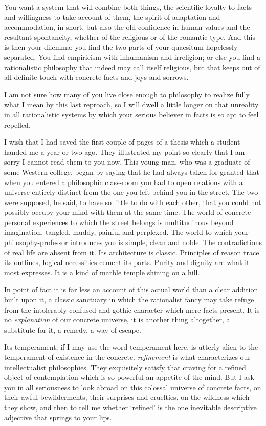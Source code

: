 \documentclass[]{article}
\begin{document}
You want a system that will combine both things, the scientific
loyalty to facts and willingness to take account of them, the spirit of
adaptation and accommodation, in short, but also the old confidence in
human values and the resultant spontaneity, whether of the religious or
of the romantic type. And this is then your dilemma: you find the two
parts of your quaesitum hopelessly separated. You find empiricism with
inhumanism and irreligion; or else you find a rationalistic philosophy
that indeed may call itself religious, but that keeps out of all
definite touch with concrete facts and joys and sorrows.

I am not sure how many of you live close enough to philosophy to realize
fully what I mean by this last reproach, so I will dwell a little longer
on that unreality in all rationalistic systems by which your serious
believer in facts is so apt to feel repelled.

I wish that I had saved the first couple of pages of a thesis which
a student handed me a year or two ago. They illustrated my point so
clearly that I am sorry I cannot read them to you now. This young man,
who was a graduate of some Western college, began by saying that he had
always taken for granted that when you entered a philosophic class-room
you had to open relations with a universe entirely distinct from the one
you left behind you in the street. The two were supposed, he said, to
have so little to do with each other, that you could not possibly occupy
your mind with them at the same time. The world of concrete personal
experiences to which the street belongs is multitudinous beyond
imagination, tangled, muddy, painful and perplexed. The world to which
your philosophy-professor introduces you is simple, clean and noble.
The contradictions of real life are absent from it. Its architecture is
classic. Principles of reason trace its outlines, logical necessities
cement its parts. Purity and dignity are what it most expresses. It is a
kind of marble temple shining on a hill.

In point of fact it is far less an account of this actual world than
a clear addition built upon it, a classic sanctuary in which the
rationalist fancy may take refuge from the intolerably confused and
gothic character which mere facts present. It is no \emph{explanation} of our
concrete universe, it is another thing altogether, a substitute for it,
a remedy, a way of escape.

Its temperament, if I may use the word temperament here, is utterly
alien to the temperament of existence in the concrete. \emph{refinement} is
what characterizes our intellectualist philosophies. They exquisitely
satisfy that craving for a refined object of contemplation which is so
powerful an appetite of the mind. But I ask you in all seriousness to
look abroad on this colossal universe of concrete facts, on their awful
bewilderments, their surprises and cruelties, on the wildness which
they show, and then to tell me whether `refined' is the one inevitable
descriptive adjective that springs to your lips.
\end{document}
